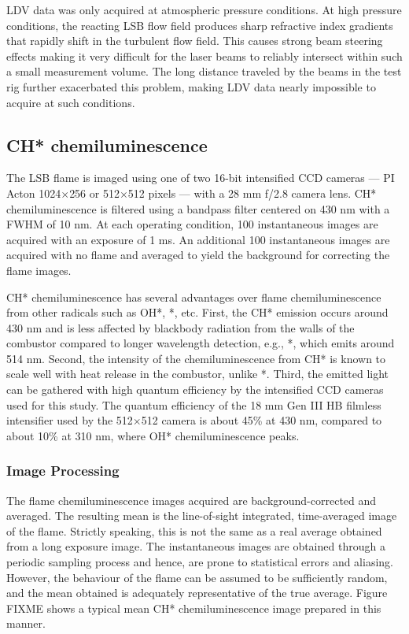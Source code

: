 LDV data was only acquired at atmospheric pressure conditions.
At high pressure conditions, the reacting LSB flow field produces sharp refractive index gradients that rapidly shift in the turbulent flow field.
This causes strong beam steering effects making it very difficult for the laser beams to reliably intersect within such a small measurement volume.
The long distance traveled by the beams in the test rig further exacerbated this problem, making LDV data nearly impossible to acquire at such conditions.

\subsection{CH* chemiluminescence}

The LSB flame is imaged using one of two 16-bit intensified CCD cameras --- PI Acton 1024\(\times\)256 or 512\(\times\)512 pixels --- with a 28 mm f/2.8 camera lens.
CH* chemiluminescence is filtered using a bandpass filter centered on 430 nm with a FWHM of 10 nm.
At each operating condition, 100 instantaneous images are acquired with an exposure of 1 ms.
An additional 100 instantaneous images are acquired with no flame and averaged to yield the background for correcting the flame images.

CH* chemiluminescence has several advantages over flame chemiluminescence from other radicals such as OH*, *, etc.
First, the CH* emission occurs around 430 nm and is less affected by blackbody radiation from the walls of the combustor compared to longer wavelength detection, e.g., *, which emits around 514 nm.
Second, the intensity of the chemiluminescence from CH* is known to scale well with heat release in the combustor\cite{2006-hardalupas}, unlike *.
Third, the emitted light can be gathered with high quantum efficiency by the intensified CCD cameras used for this study.
The quantum efficiency of the 18 mm Gen III HB filmless intensifier used by the 512\(\times\)512 camera is about 45\% at 430 nm, compared to about 10\% at 310 nm, where OH* chemiluminescence peaks.

\subsubsection{Image Processing}

The flame chemiluminescence images acquired are background-corrected and averaged.
The resulting mean is the line-of-sight integrated, time-averaged image of the flame.
Strictly speaking, this is not the same as a real average obtained from a long exposure image.
The instantaneous images are obtained through a periodic sampling process and hence, are prone to statistical errors and aliasing.
However, the behaviour of the flame can be assumed to be sufficiently random, and the mean obtained is adequately representative of the true average.
Figure FIXME shows a typical mean CH* chemiluminescence image prepared in this manner.

